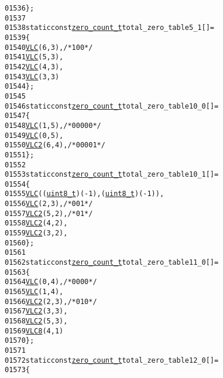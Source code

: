 \begin{footnotesize}
\begin{alltt}
01536 \};
01537 
01538 \textcolor{keyword}{static} \textcolor{keyword}{const} \hyperlink{structzero__count__t}{zero_count_t} total\_zero\_table5\_1[] = 
01539 \{
01540         \hyperlink{vlc_8h_a7f3572774a720fd9b4bc3b1a0b65082f}{VLC}(6, 3), \textcolor{comment}{/* 100 */}
01541         \hyperlink{vlc_8h_a7f3572774a720fd9b4bc3b1a0b65082f}{VLC}(5, 3),
01542         \hyperlink{vlc_8h_a7f3572774a720fd9b4bc3b1a0b65082f}{VLC}(4, 3),
01543         \hyperlink{vlc_8h_a7f3572774a720fd9b4bc3b1a0b65082f}{VLC}(3, 3)
01544 \};
01545 
01546 \textcolor{keyword}{static} \textcolor{keyword}{const} \hyperlink{structzero__count__t}{zero_count_t} total\_zero\_table10\_0[] = 
01547 \{
01548         \hyperlink{vlc_8h_a7f3572774a720fd9b4bc3b1a0b65082f}{VLC}(1, 5), \textcolor{comment}{/* 0000 0 */}
01549         \hyperlink{vlc_8h_a7f3572774a720fd9b4bc3b1a0b65082f}{VLC}(0, 5),
01550         \hyperlink{vlc_8h_ad3cda36b9c6132357c7f7de5e52a6c93}{VLC2}(6, 4), \textcolor{comment}{/* 0000 1 */}
01551 \};
01552 
01553 \textcolor{keyword}{static} \textcolor{keyword}{const} \hyperlink{structzero__count__t}{zero_count_t} total\_zero\_table10\_1[] = 
01554 \{
01555         \hyperlink{vlc_8h_a7f3572774a720fd9b4bc3b1a0b65082f}{VLC}((\hyperlink{_types_8h_a363e4d606232036a6b89060813c45489}{uint8_t})(-1), (\hyperlink{_types_8h_a363e4d606232036a6b89060813c45489}{uint8_t})(-1)),
01556         \hyperlink{vlc_8h_a7f3572774a720fd9b4bc3b1a0b65082f}{VLC}(2, 3), \textcolor{comment}{/* 001 */}
01557         \hyperlink{vlc_8h_ad3cda36b9c6132357c7f7de5e52a6c93}{VLC2}(5, 2), \textcolor{comment}{/* 01 */}
01558         \hyperlink{vlc_8h_ad3cda36b9c6132357c7f7de5e52a6c93}{VLC2}(4, 2),
01559         \hyperlink{vlc_8h_ad3cda36b9c6132357c7f7de5e52a6c93}{VLC2}(3, 2),
01560 \};
01561 
01562 \textcolor{keyword}{static} \textcolor{keyword}{const} \hyperlink{structzero__count__t}{zero_count_t} total\_zero\_table11\_0[] = 
01563 \{
01564         \hyperlink{vlc_8h_a7f3572774a720fd9b4bc3b1a0b65082f}{VLC}(0, 4), \textcolor{comment}{/* 0000 */}
01565         \hyperlink{vlc_8h_a7f3572774a720fd9b4bc3b1a0b65082f}{VLC}(1, 4),
01566         \hyperlink{vlc_8h_ad3cda36b9c6132357c7f7de5e52a6c93}{VLC2}(2, 3), \textcolor{comment}{/* 010 */}
01567         \hyperlink{vlc_8h_ad3cda36b9c6132357c7f7de5e52a6c93}{VLC2}(3, 3),
01568         \hyperlink{vlc_8h_ad3cda36b9c6132357c7f7de5e52a6c93}{VLC2}(5, 3),
01569         \hyperlink{vlc_8h_a0a94088f44f593387fb86112a6c7da9c}{VLC8}(4, 1)
01570 \};
01571 
01572 \textcolor{keyword}{static} \textcolor{keyword}{const} \hyperlink{structzero__count__t}{zero_count_t} total\_zero\_table12\_0[] = 
01573 \{

\end{alltt}
\end{footnotesize}
